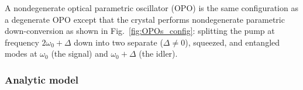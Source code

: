 
A nondegenerate optical parametric oscillator (OPO) is the same configuration as a degenerate OPO except that the crystal performs nondegenerate parametric down-conversion as shown in Fig.~\ref{fig:OPOs_config}: splitting the pump at frequency $2\omega_0+\Delta$ down into two separate ($\Delta\neq0$), squeezed, and entangled modes at $\omega_0$ (the signal) and $\omega_0+\Delta$ (the idler). %

\subsubsection{Analytic model}

